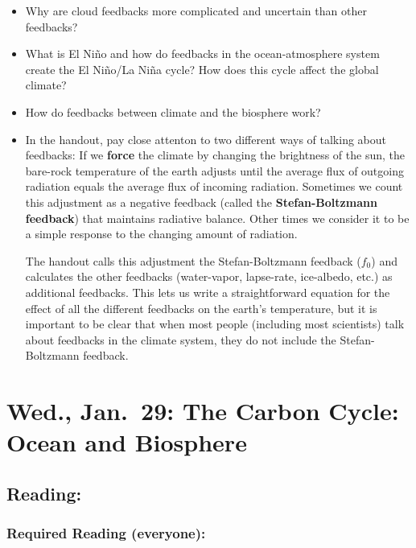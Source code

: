 \documentclass[
]{article}
\begin{document}
\begin{itemize}
\item
  Why are cloud feedbacks more complicated and uncertain than other
  feedbacks?
\item
  What is El Niño and how do feedbacks in the ocean-atmosphere system
  create the El Niño/La Niña cycle? How does this cycle affect the
  global climate?
\item
  How do feedbacks between climate and the biosphere work?
\item
  In the handout, pay close attenton to two different ways of talking
  about feedbacks: If we \textbf{force} the climate by changing the
  brightness of the sun, the bare-rock temperature of the earth adjusts
  until the average flux of outgoing radiation equals the average flux
  of incoming radiation. Sometimes we count this adjustment as a
  negative feedback (called the \textbf{Stefan-Boltzmann feedback}) that
  maintains radiative balance. Other times we consider it to be a simple
  response to the changing amount of radiation.

  The handout calls this adjustment the Stefan-Boltzmann feedback
  (\(f_0\)) and calculates the other feedbacks (water-vapor, lapse-rate,
  ice-albedo, etc.) as additional feedbacks. This lets us write a
  straightforward equation for the effect of all the different feedbacks
  on the earth's temperature, but it is important to be clear that when
  most people (including most scientists) talk about feedbacks in the
  climate system, they do not include the Stefan-Boltzmann feedback.
\end{itemize}

\hypertarget{wed.-jan.-29-the-carbon-cycle-ocean-and-biosphere}{%
\section{Wed., Jan.~29: The Carbon Cycle: Ocean and
Biosphere}\label{wed.-jan.-29-the-carbon-cycle-ocean-and-biosphere}}

\hypertarget{reading-9}{%
\subsection{Reading:}\label{reading-9}}

\hypertarget{required-reading-everyone-7}{%
\subsubsection{Required Reading
(everyone):}\label{required-reading-everyone-7}}
\end{document}
